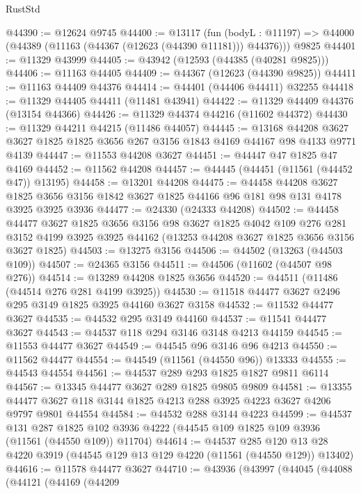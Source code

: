 \begin{lexlean}{RustStd}
\begin{coremodule}
@44390 := @12624 @9745
@44400 := @13117
    (fun (bodyL : @11197) => @44000 (@44389 (@11163 (@44367 (@12623 (@44390 @11181))) @44376)))
    @9825
@44401 := @11329 @43999
@44405 := @43942 (@12593 (@44385 (@40281 @9825)))
@44406 := @11163 @44405
@44409 := @44367 (@12623 (@44390 @9825))
@44411 := @11163 @44409 @44376
@44414 := @44401 (@44406 @44411) @32255
@44418 := @11329 @44405 @44411 (@11481 @43941)
@44422 := @11329 @44409 @44376 (@13154 @44366)
@44426 := @11329 @44374 @44216 (@11602 @44372)
@44430 := @11329 @44211 @44215 (@11486 @44057)
@44445 := @13168
    @44208
    @3627
    @3627
    @1825
    @1825
    @3656
    @267
    @3156
    @1843
    @4169
    @44167
    @98
    @4133
    @9771
    @4139
@44447 := @11553 @44208 @3627
@44451 := @44447 @47 @1825 @47 @4169
@44452 := @11562 @44208
@44457 := @44445 (@44451 (@11561 (@44452 @47)) @13195)
@44458 := @13201 @44208
@44475 := @44458
    @44208
    @3627
    @1825
    @3656
    @3156
    @1842
    @3627
    @1825
    @44166
    @96
    @181
    @98
    @131
    @4178
    @3925
    @3925
    @3936
@44477 := @24330 (@24333 @44208)
@44502 := @44458
    @44477
    @3627
    @1825
    @3656
    @3156
    @98
    @3627
    @1825
    @4042
    @109
    @276
    @281
    @3152
    @4199
    @3925
    @3925
    @44162
    (@13253 @44208 @3627 @1825 @3656 @3156 @3627 @1825)
@44503 := @13275 @3156
@44506 := @44502 (@13263 (@44503 @109))
@44507 := @24365 @3156
@44511 := @44506 (@11602 (@44507 @98 @276))
@44514 := @13289 @44208 @1825 @3656
@44520 := @44511 (@11486 (@44514 @276 @281 @4199 @3925))
@44530 := @11518 @44477 @3627 @2496 @295 @3149 @1825 @3925 @44160 @3627 @3158
@44532 := @11532 @44477 @3627
@44535 := @44532 @295 @3149 @44160
@44537 := @11541 @44477 @3627
@44543 := @44537 @118 @294 @3146 @3148 @4213 @44159
@44545 := @11553 @44477 @3627
@44549 := @44545 @96 @3146 @96 @4213
@44550 := @11562 @44477
@44554 := @44549 (@11561 (@44550 @96)) @13333
@44555 := @44543 @44554
@44561 := @44537 @289 @293 @1825 @1827 @9811 @6114
@44567 := @13345 @44477 @3627 @289 @1825 @9805 @9809
@44581 := @13355 @44477 @3627 @118 @3144 @1825 @4213 @288 @3925 @4223 @3627 @4206 @9797 @9801 @44554
@44584 := @44532 @288 @3144 @4223
@44599 := @44537
    @131
    @287
    @1825
    @102
    @3936
    @4222
    (@44545 @109 @1825 @109 @3936 (@11561 (@44550 @109)) @11704)
@44614 := @44537
    @285
    @120
    @13
    @28
    @4220
    @3919
    (@44545 @129 @13 @129 @4220 (@11561 (@44550 @129)) @13402)
@44616 := @11578 @44477 @3627
@44710 := @43936
    (@43997
      (@44045
        (@44088
          (@44121
            (@44169
              (@44209

\end{coremodule}
\end{lexlean}
